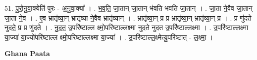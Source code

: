 \documentclass[17pt]{extarticle}
\begin{document}
51. पु॒रो॒नु॒वा॒क्येति॑ पुरः - अ॒नु॒वा॒क्या᳚ । . भ॒व॒ति॒ जा॒तान् जा॒तान् भ॑वति भवति जा॒तान् । . जा॒ता ने॒वैव जा॒तान् जा॒ता ने॒व । . ए॒व भ्रातृ॑व्या॒न् भ्रातृ॑व्या ने॒वैव भ्रातृ॑व्यान् । . भ्रातृ॑व्या॒न् प्र प्र भ्रातृ॑व्या॒न् भ्रातृ॑व्या॒न् प्र । . प्र णु॑दते नुदते॒ प्र प्र णु॑दते । . नु॒द॒त॒ उ॒परि॑ष्टाल्ल क्ष्मो॒परि॑ष्टाल्लक्ष्मा नुदते नुदत उ॒परि॑ष्टाल्लक्ष्मा । . उ॒परि॑ष्टाल्लक्ष्मा या॒ज्या॑ या॒ज्यो॑परि॑ष्टाल्ल क्ष्मो॒परि॑ष्टाल्लक्ष्मा या॒ज्या᳚ । . उ॒परि॑ष्टाल्ल॒क्ष्मेत्यु॒परि॑ष्टात् - ल॒क्ष्मा॒ । \newline

\textbf{Ghana Paata } \newline
\end{document}
